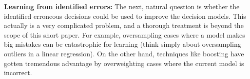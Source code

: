 
\textbf{Learning from identified errors:} The next, natural question is whether the identified erroneous decisions could be used to improve the decision models.  This actually is a very complicated problem, and a thorough treatment is beyond the scope of this short paper. For example, oversampling cases where a model makes big mistakes can be catastrophic for 
learning (think simply about oversampling outliers in a linear regression).
On the other hand, techniques like boosting \cite{Freund99ashort} have gotten tremendous
advantage by overweighting cases where the current model is incorrect.

